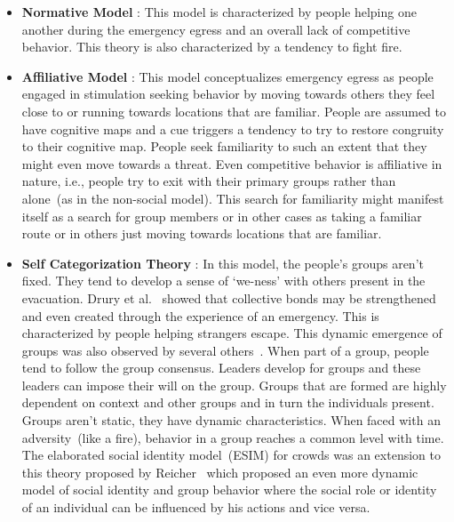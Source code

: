 \begin{itemize}
\item {\bf Normative Model }: This model is characterized by people helping one another during the emergency egress and an overall lack of competitive behavior. This theory is also characterized by a tendency to fight fire.

\item {\bf Affiliative Model }: This model conceptualizes emergency egress as people engaged in stimulation seeking behavior by moving towards others they feel close to or running towards locations that are familiar. People are assumed to have cognitive maps and a cue triggers a tendency to try to restore congruity to their cognitive map. People seek familiarity to such an extent that they might even move towards a threat. Even competitive behavior is affiliative in nature, i.e., people try to exit with their primary groups rather than alone~(as in the non-social model). This search for familiarity might manifest itself as a search for group members or in other cases as taking a familiar route or in others just moving towards locations that are familiar.

\item {\bf Self Categorization Theory }: In this model, the people's groups aren't fixed. They tend to develop a sense of `we-ness' with others present in the evacuation. Drury et al.~\cite{Drury:2009ga} showed that collective bonds may be strengthened and even created through the experience of an emergency. This is characterized by people helping strangers escape. This dynamic emergence of groups was also observed by several others~\cite{Aveni:1997wq,Reicher:2008ep,Cocking:2007wp,Cocking:2008vv}. When part of a group, people tend to follow the group consensus. Leaders develop for groups and these leaders can impose their will on the group. Groups that are formed are highly dependent on context and other groups and in turn the individuals present. Groups aren't static, they have dynamic characteristics. When faced with an adversity~(like a fire), behavior in a group reaches a common level with time. The elaborated social identity model~(ESIM) for crowds was an extension to this theory proposed by Reicher~\cite{Reicher:2008ep} which proposed an even more dynamic model of social identity and group behavior where the social role or identity of an individual can be influenced by his actions and vice versa.
\end{itemize}

